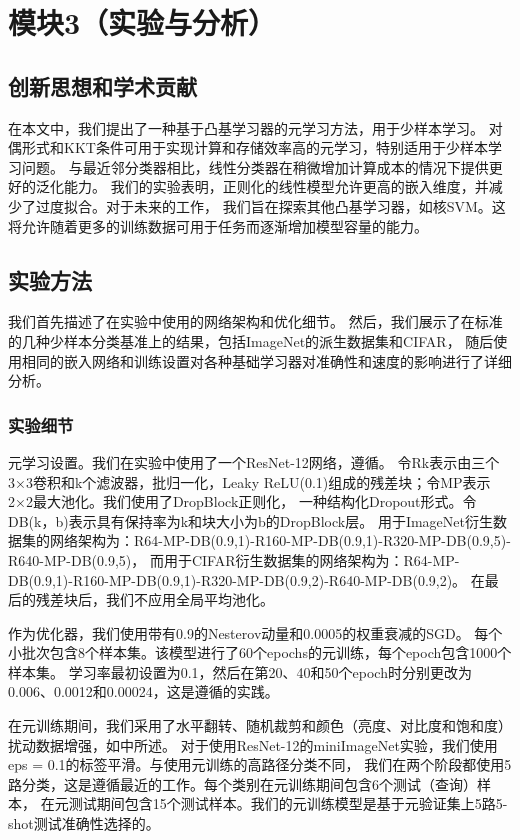 \chapter{模块3（实验与分析）}

\section{创新思想和学术贡献}

在本文中，我们提出了一种基于凸基学习器的元学习方法，用于少样本学习。
对偶形式和KKT条件可用于实现计算和存储效率高的元学习，特别适用于少样本学习问题。
与最近邻分类器相比，线性分类器在稍微增加计算成本的情况下提供更好的泛化能力。
我们的实验表明，正则化的线性模型允许更高的嵌入维度，并减少了过度拟合。对于未来的工作，
我们旨在探索其他凸基学习器，如核SVM。这将允许随着更多的训练数据可用于任务而逐渐增加模型容量的能力。

\section{实验方法}
我们首先描述了在实验中使用的网络架构和优化细节。
然后，我们展示了在标准的几种少样本分类基准上的结果，包括ImageNet的派生数据集和CIFAR，
随后使用相同的嵌入网络和训练设置对各种基础学习器对准确性和速度的影响进行了详细分析。
\subsection{实验细节}
元学习设置。我们在实验中使用了一个ResNet-12网络，遵循\cite{oreshkin2018tadam,mishra2017simple}。
令Rk表示由三个{3×3卷积和k个滤波器，批归一化，Leaky ReLU(0.1)}组成的残差块；令MP表示2×2最大池化。我们使用了DropBlock正则化\cite{ghiasi2018dropblock}，
一种结构化Dropout形式。令DB(k，b)表示具有保持率为k和块大小为b的DropBlock层。
用于ImageNet衍生数据集的网络架构为：R64-MP-DB(0.9,1)-R160-MP-DB(0.9,1)-R320-MP-DB(0.9,5)-R640-MP-DB(0.9,5)，
而用于CIFAR衍生数据集的网络架构为：R64-MP-DB(0.9,1)-R160-MP-DB(0.9,1)-R320-MP-DB(0.9,2)-R640-MP-DB(0.9,2)。
在最后的残差块后，我们不应用全局平均池化。

作为优化器，我们使用带有0.9的Nesterov动量和0.0005的权重衰减的SGD。
每个小批次包含8个样本集。该模型进行了60个epochs的元训练，每个epoch包含1000个样本集。
学习率最初设置为0.1，然后在第20、40和50个epoch时分别更改为0.006、0.0012和0.00024，这是遵循\cite{gidaris2018dynamic}的实践。

在元训练期间，我们采用了水平翻转、随机裁剪和颜色（亮度、对比度和饱和度）扰动数据增强，如\cite{gidaris2018dynamic,qiao2018few}中所述。
对于使用ResNet-12的miniImageNet实验，我们使用eps = 0.1的标签平滑。与\cite{snell2017prototypical}使用元训练的高路径分类不同，
我们在两个阶段都使用5路分类，这是遵循最近的工作\cite{gidaris2018dynamic,oreshkin2018tadam}。每个类别在元训练期间包含6个测试（查询）样本，
在元测试期间包含15个测试样本。我们的元训练模型是基于元验证集上5路5-shot测试准确性选择的。

